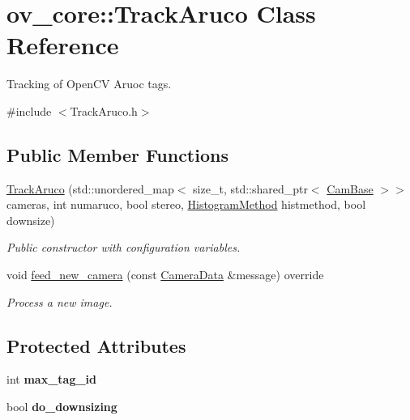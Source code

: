 \hypertarget{classov__core_1_1TrackAruco}{}\section{ov\+\_\+core\+:\+:Track\+Aruco Class Reference}
\label{classov__core_1_1TrackAruco}


Tracking of Open\+CV Aruoc tags.  




{\ttfamily \#include $<$Track\+Aruco.\+h$>$}

\subsection*{Public Member Functions}
\begin{DoxyCompactItemize}
\item 
\hyperlink{classov__core_1_1TrackAruco_adaa89be7ced3917bdedc89d69a2269a4}{Track\+Aruco} (std\+::unordered\+\_\+map$<$ size\+\_\+t, std\+::shared\+\_\+ptr$<$ \hyperlink{classov__core_1_1CamBase}{Cam\+Base} $>$$>$ cameras, int numaruco, bool stereo, \hyperlink{classov__core_1_1TrackBase_aa4b34a5dce99b59522d57bf9278c9a1a}{Histogram\+Method} histmethod, bool downsize)
\begin{DoxyCompactList}\small\item\em Public constructor with configuration variables. \end{DoxyCompactList}\item 
void \hyperlink{classov__core_1_1TrackAruco_a8c6b74f31cabe516bb9ceb2d2326a2a9}{feed\+\_\+new\+\_\+camera} (const \hyperlink{structov__core_1_1CameraData}{Camera\+Data} \&message) override
\begin{DoxyCompactList}\small\item\em Process a new image. \end{DoxyCompactList}\end{DoxyCompactItemize}
\subsection*{Protected Attributes}
\begin{DoxyCompactItemize}
\item 
\mbox{\label{classov__core_1_1TrackAruco_aa3ff6eb47e6cadf050de259018b2eeb4}} 
int {\bfseries max\+\_\+tag\+\_\+id}
\item 
\mbox{\label{classov__core_1_1TrackAruco_abac36e58c6ce51e6a4783a4884aa3765}} 
bool {\bfseries do\+\_\+downsizing}
\end{DoxyCompactItemize}
